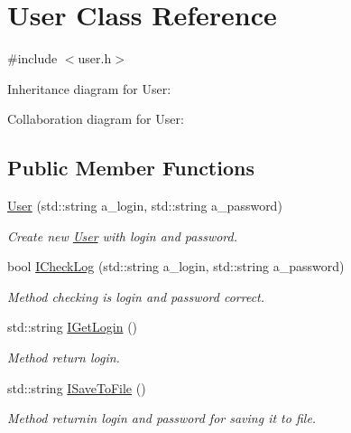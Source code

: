 \hypertarget{classUser}{}\section{User Class Reference}
\label{classUser}


{\ttfamily \#include $<$user.\+h$>$}



Inheritance diagram for User\+:


Collaboration diagram for User\+:
\subsection*{Public Member Functions}
\begin{DoxyCompactItemize}
\item 
\hyperlink{classUser_adf70eef5e6d21f9a84290dc4aa1d5f21}{User} (std\+::string a\+\_\+login, std\+::string a\+\_\+password)\hypertarget{classUser_adf70eef5e6d21f9a84290dc4aa1d5f21}{}\label{classUser_adf70eef5e6d21f9a84290dc4aa1d5f21}

\begin{DoxyCompactList}\small\item\em Create new \hyperlink{classUser}{User} with login and password. \end{DoxyCompactList}\item 
bool \hyperlink{classUser_a1949b221d5b9142fc6b873ab1f5feed6}{I\+Check\+Log} (std\+::string a\+\_\+login, std\+::string a\+\_\+password)\hypertarget{classUser_a1949b221d5b9142fc6b873ab1f5feed6}{}\label{classUser_a1949b221d5b9142fc6b873ab1f5feed6}

\begin{DoxyCompactList}\small\item\em Method checking is login and password correct. \end{DoxyCompactList}\item 
std\+::string \hyperlink{classUser_ac12b18720e84b74d18f34c9c1981f6f6}{I\+Get\+Login} ()\hypertarget{classUser_ac12b18720e84b74d18f34c9c1981f6f6}{}\label{classUser_ac12b18720e84b74d18f34c9c1981f6f6}

\begin{DoxyCompactList}\small\item\em Method return login. \end{DoxyCompactList}\item 
std\+::string \hyperlink{classUser_ab6265ead11a9f3beabe52f94691eb20a}{I\+Save\+To\+File} ()\hypertarget{classUser_ab6265ead11a9f3beabe52f94691eb20a}{}\label{classUser_ab6265ead11a9f3beabe52f94691eb20a}

\begin{DoxyCompactList}\small\item\em Method returnin login and password for saving it to file. \end{DoxyCompactList}\end{DoxyCompactItemize}


